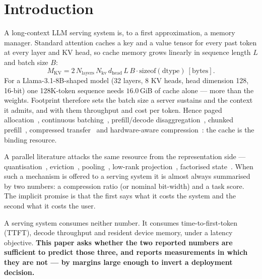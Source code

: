 \documentclass[sigplan,10pt,anonymous,review,nonacm]{acmart}
\begin{document}
\maketitle

\section{Introduction}
\label{sec:intro}

A long-context LLM serving system is, to a first approximation, a memory
manager. Standard attention caches a key and a value tensor for every past
token at every layer and KV head, so cache memory grows linearly in sequence
length $L$ and batch size $B$:
\begin{equation}
\label{eq:kv_size}
M_{\text{KV}} = 2 \, N_{\text{layers}} \, N_{\text{kv}} \, d_{\text{head}}
                \, L \, B \cdot \text{sizeof}(\text{dtype}) \ [\text{bytes}].
\end{equation}
For a Llama-3.1-8B-shaped model (32 layers, 8 KV heads, head dimension 128,
16-bit) one 128K-token sequence needs $16.0$\,GiB of cache alone --- more than
the weights. Footprint therefore sets the batch size a server sustains and the
context it admits, and with them throughput and cost per token. Hence paged
allocation~\cite{kwon2023pagedattention}, continuous
batching~\cite{yu2022orca}, prefill/decode
disaggregation~\cite{zhong2024distserve}, chunked
prefill~\cite{agrawal2024sarathi}, compressed
transfer~\cite{liu2024cachegen} and hardware-aware
compression~\cite{fan2026zipserv}: the cache is the binding resource.

A parallel literature attacks the same resource from the representation side
--- quantisation~\cite{liu2024kivi,hooper2024kvquant},
eviction~\cite{li2024snapkv,xiao2023streamingllm,zhang2023h2o},
pooling~\cite{ge2023model}, low-rank projection~\cite{sharma2023truth},
factorised state~\cite{dkvpreprint}. When such a mechanism is offered to a
serving system it is almost always summarised by two numbers: a compression
ratio (or nominal bit-width) and a task score. The implicit promise is that
the first says what it costs the system and the second what it costs the user.

A serving system consumes neither number. It consumes time-to-first-token
(TTFT), decode throughput and resident device memory, under a latency
objective. \textbf{This paper asks whether the two reported numbers are
sufficient to predict those three, and reports measurements in which they are
not --- by margins large enough to invert a deployment decision.}
\end{document}
